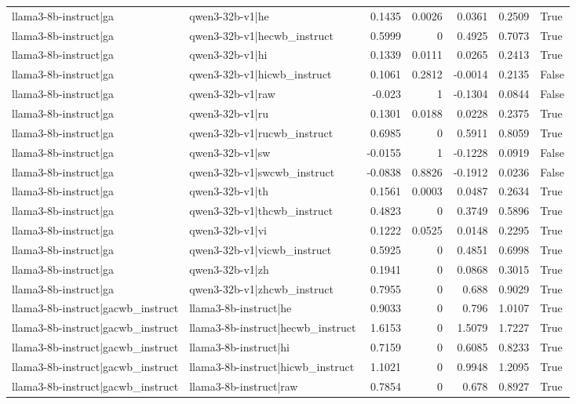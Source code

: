 \begin{table}
\begin{tabular}{l l r r r r l}
llama3-8b-instruct|ga & qwen3-32b-v1|he & 0.1435 & 0.0026 & 0.0361 & 0.2509 & True \\
llama3-8b-instruct|ga & qwen3-32b-v1|hecwb_instruct & 0.5999 & 0 & 0.4925 & 0.7073 & True \\
llama3-8b-instruct|ga & qwen3-32b-v1|hi & 0.1339 & 0.0111 & 0.0265 & 0.2413 & True \\
llama3-8b-instruct|ga & qwen3-32b-v1|hicwb_instruct & 0.1061 & 0.2812 & -0.0014 & 0.2135 & False \\
llama3-8b-instruct|ga & qwen3-32b-v1|raw & -0.023 & 1 & -0.1304 & 0.0844 & False \\
llama3-8b-instruct|ga & qwen3-32b-v1|ru & 0.1301 & 0.0188 & 0.0228 & 0.2375 & True \\
llama3-8b-instruct|ga & qwen3-32b-v1|rucwb_instruct & 0.6985 & 0 & 0.5911 & 0.8059 & True \\
llama3-8b-instruct|ga & qwen3-32b-v1|sw & -0.0155 & 1 & -0.1228 & 0.0919 & False \\
llama3-8b-instruct|ga & qwen3-32b-v1|swcwb_instruct & -0.0838 & 0.8826 & -0.1912 & 0.0236 & False \\
llama3-8b-instruct|ga & qwen3-32b-v1|th & 0.1561 & 0.0003 & 0.0487 & 0.2634 & True \\
llama3-8b-instruct|ga & qwen3-32b-v1|thcwb_instruct & 0.4823 & 0 & 0.3749 & 0.5896 & True \\
llama3-8b-instruct|ga & qwen3-32b-v1|vi & 0.1222 & 0.0525 & 0.0148 & 0.2295 & True \\
llama3-8b-instruct|ga & qwen3-32b-v1|vicwb_instruct & 0.5925 & 0 & 0.4851 & 0.6998 & True \\
llama3-8b-instruct|ga & qwen3-32b-v1|zh & 0.1941 & 0 & 0.0868 & 0.3015 & True \\
llama3-8b-instruct|ga & qwen3-32b-v1|zhcwb_instruct & 0.7955 & 0 & 0.688 & 0.9029 & True \\
llama3-8b-instruct|gacwb_instruct & llama3-8b-instruct|he & 0.9033 & 0 & 0.796 & 1.0107 & True \\
llama3-8b-instruct|gacwb_instruct & llama3-8b-instruct|hecwb_instruct & 1.6153 & 0 & 1.5079 & 1.7227 & True \\
llama3-8b-instruct|gacwb_instruct & llama3-8b-instruct|hi & 0.7159 & 0 & 0.6085 & 0.8233 & True \\
llama3-8b-instruct|gacwb_instruct & llama3-8b-instruct|hicwb_instruct & 1.1021 & 0 & 0.9948 & 1.2095 & True \\
llama3-8b-instruct|gacwb_instruct & llama3-8b-instruct|raw & 0.7854 & 0 & 0.678 & 0.8927 & True \\

\end{tabular}
\end{table}
